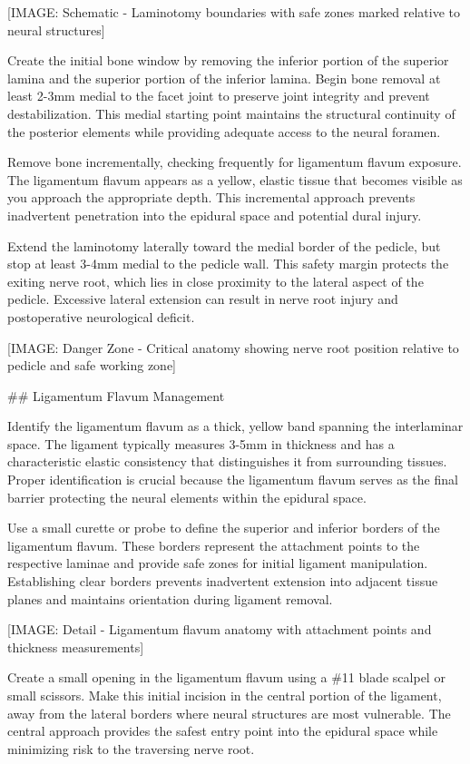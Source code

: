 \documentclass[12pt,a4paper]{article}
\begin{document}
[IMAGE: Schematic - Laminotomy boundaries with safe zones marked relative to neural structures]

Create the initial bone window by removing the inferior portion of the superior lamina and the superior portion of the inferior lamina. Begin bone removal at least 2-3mm medial to the facet joint to preserve joint integrity and prevent destabilization. This medial starting point maintains the structural continuity of the posterior elements while providing adequate access to the neural foramen.

Remove bone incrementally, checking frequently for ligamentum flavum exposure. The ligamentum flavum appears as a yellow, elastic tissue that becomes visible as you approach the appropriate depth. This incremental approach prevents inadvertent penetration into the epidural space and potential dural injury.

Extend the laminotomy laterally toward the medial border of the pedicle, but stop at least 3-4mm medial to the pedicle wall. This safety margin protects the exiting nerve root, which lies in close proximity to the lateral aspect of the pedicle. Excessive lateral extension can result in nerve root injury and postoperative neurological deficit.

[IMAGE: Danger Zone - Critical anatomy showing nerve root position relative to pedicle and safe working zone]

\#\# Ligamentum Flavum Management

Identify the ligamentum flavum as a thick, yellow band spanning the interlaminar space. The ligament typically measures 3-5mm in thickness and has a characteristic elastic consistency that distinguishes it from surrounding tissues. Proper identification is crucial because the ligamentum flavum serves as the final barrier protecting the neural elements within the epidural space.

Use a small curette or probe to define the superior and inferior borders of the ligamentum flavum. These borders represent the attachment points to the respective laminae and provide safe zones for initial ligament manipulation. Establishing clear borders prevents inadvertent extension into adjacent tissue planes and maintains orientation during ligament removal.

[IMAGE: Detail - Ligamentum flavum anatomy with attachment points and thickness measurements]

Create a small opening in the ligamentum flavum using a \#11 blade scalpel or small scissors. Make this initial incision in the central portion of the ligament, away from the lateral borders where neural structures are most vulnerable. The central approach provides the safest entry point into the epidural space while minimizing risk to the traversing nerve root.
\end{document}
